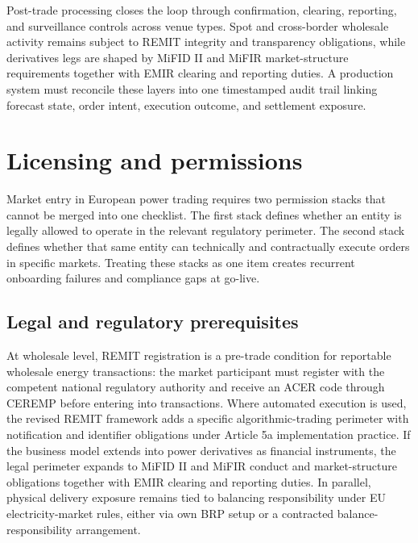 \documentclass[oneside,10pt]{swissi}
\begin{document}
Post-trade processing closes the loop through confirmation, clearing, reporting, and surveillance controls across venue types. Spot and cross-border wholesale activity remains subject to REMIT integrity and transparency obligations, while derivatives legs are shaped by MiFID II and MiFIR market-structure requirements together with EMIR clearing and reporting duties. A production system must reconcile these layers into one timestamped audit trail linking forecast state, order intent, execution outcome, and settlement exposure.\cite{eu_reg_2011_1227_remit,eu_dir_2014_65_mifid2,eu_reg_2014_600_mifir,eu_reg_2012_648_emir}

\section{Licensing and permissions}
Market entry in European power trading requires two permission stacks that cannot be merged into one checklist. The first stack defines whether an entity is legally allowed to operate in the relevant regulatory perimeter. The second stack defines whether that same entity can technically and contractually execute orders in specific markets. Treating these stacks as one item creates recurrent onboarding failures and compliance gaps at go-live.

\subsection{Legal and regulatory prerequisites}
At wholesale level, REMIT registration is a pre-trade condition for reportable wholesale energy transactions: the market participant must register with the competent national regulatory authority and receive an ACER code through CEREMP before entering into transactions.\cite{eu_reg_2011_1227_remit,acer_remit_registration_market_participants_2026} Where automated execution is used, the revised REMIT framework adds a specific algorithmic-trading perimeter with notification and identifier obligations under Article 5a implementation practice.\cite{eu_reg_2024_1106_remit2,acer_remit_algorithmic_notifications_2024} If the business model extends into power derivatives as financial instruments, the legal perimeter expands to MiFID II and MiFIR conduct and market-structure obligations together with EMIR clearing and reporting duties.\cite{eu_dir_2014_65_mifid2,eu_reg_2014_600_mifir,eu_reg_2012_648_emir} In parallel, physical delivery exposure remains tied to balancing responsibility under EU electricity-market rules, either via own BRP setup or a contracted balance-responsibility arrangement.\cite{eu_reg_2019_943,eu_reg_2017_2195_ebgl}
\end{document}
